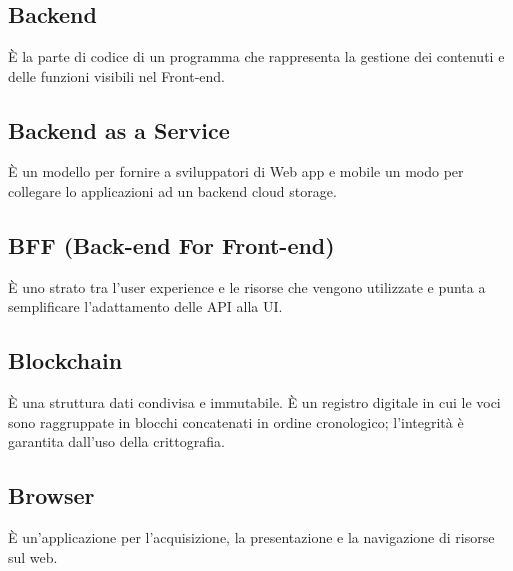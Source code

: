 \section{}
\subsection*{Backend} È la parte di codice di un programma che rappresenta la gestione dei contenuti e delle funzioni visibili nel Front-end.

\subsection*{Backend as a Service} È un modello per fornire a sviluppatori di Web app e mobile un modo per collegare lo applicazioni ad un backend cloud storage.

\subsection*{BFF (Back-end For Front-end)} È uno strato tra l'user experience e le risorse che vengono utilizzate e punta a semplificare l'adattamento delle API alla UI.

\subsection*{Blockchain} È una struttura dati condivisa e immutabile. È un registro digitale in cui le voci sono raggruppate in blocchi concatenati in ordine cronologico; l'integrità è garantita dall'uso della crittografia.

\subsection*{Browser} È un'applicazione per l'acquisizione, la presentazione e la navigazione di risorse sul web.